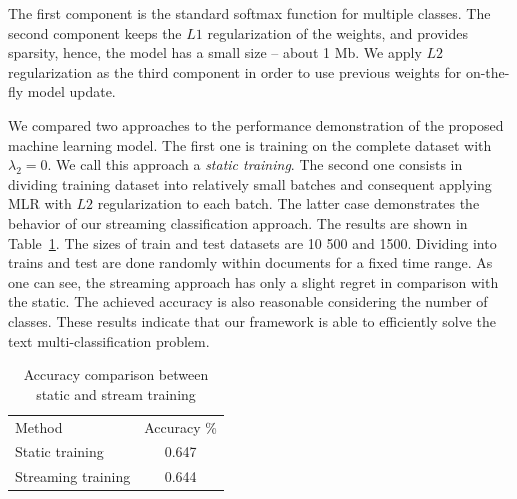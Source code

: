 The first component is the standard softmax function for multiple classes. The second component keeps the $L1$ regularization of the weights, and provides sparsity, hence, the model has a small size -- about 1 Mb. We apply $L2$ regularization as the third component in order to use previous weights for on-the-fly model update.

We compared two approaches to the performance demonstration of the proposed machine learning model. The first one is training on the complete dataset with $\lambda_2 = 0$. We call this approach a {\em static training}. The second one consists in dividing training dataset into relatively small batches and consequent applying MLR with $L2$ regularization to each batch. The latter case demonstrates the behavior of our streaming classification approach. The results are shown in Table~\ref{accuracy}. The sizes of train and test datasets are 10 500 and 1500. Dividing into trains and test are done randomly within documents for a fixed time range. As one can see, the streaming approach has only a slight regret in comparison with the static. The achieved accuracy is also reasonable considering the number of classes. These results indicate that our framework is able to efficiently solve the text multi-classification problem.

\begin{table}[htbp]
\begin{tabular}{lc}
Method             & Accuracy \% \\
Static training    & 0.647       \\
Streaming training & 0.644         
\end{tabular}
\caption{Accuracy comparison between static and stream training}
\label{accuracy}
\vspace{-7mm}
\end{table}